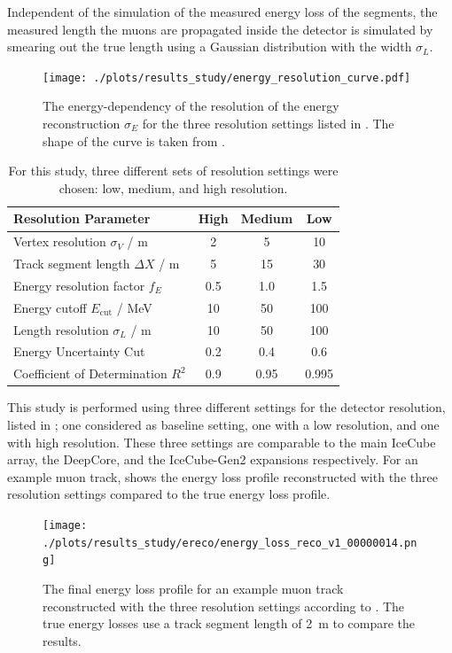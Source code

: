 Independent of the simulation of the measured energy loss of the segments, the measured length the muons are propagated inside the detector is simulated by smearing out the true length using a Gaussian distribution with the width $\sigma_L$.
\begin{figure}
    \centering
    \texttt{[image: ./plots/results\_study/energy\_resolution\_curve.pdf]}
    \caption{The energy-dependency of the resolution of the energy reconstruction $\sigma_E$ for the three resolution settings listed in . The shape of the curve is taken from \cite{IceCube2014Ereco}.}
    \label{fig:study_energy_resolution_curve}
\end{figure}
\begin{table}
    \centering
    \caption{For this study, three different sets of resolution settings
        were chosen: low, medium, and high resolution.}
    \label{tab:study_resolutions}
    \begin{tabular}{l | c c c}
        \toprule
        Resolution Parameter & High & Medium & Low \\
        \midrule
        Vertex resolution $\sigma_V$ / m & 2 & 5 & 10 \\
        Track segment length $\Delta X$ / m & 5 & 15 & 30 \\
        Energy resolution factor $f_E$ & 0.5 & 1.0 & 1.5 \\
        Energy cutoff $E_{\mathrm{cut}}$ / MeV & 10 & 50 & 100 \\
        Length resolution $\sigma_L$ / m & 10 & 50 & 100 \\
        \midrule
        Energy Uncertainty Cut & 0.2 & 0.4 & 0.6 \\
        Coefficient of Determination $R^2$ & 0.9 & 0.95 & 0.995 \\
        \bottomrule
    \end{tabular}
\end{table}

This study is performed using three different settings for the detector resolution, listed in ; one considered as baseline setting, one with a low resolution, and one with high resolution.
These three settings are comparable to the main IceCube array, the DeepCore, and the IceCube-Gen2 expansions respectively.
For an example muon track,  shows the energy loss profile reconstructed with the three resolution settings compared to the true energy loss profile.
\begin{figure}
    \centering
    \texttt{[image: ./plots/results\_study/ereco/energy\_loss\_reco\_v1\_00000014.png]}
    \caption{The final energy loss profile for an example muon track reconstructed with the three resolution settings according to . The true energy losses use a track segment length of \SI{2}{m} to compare the results.}
    \label{fig:study_ereco_eloss_profile}
\end{figure}

